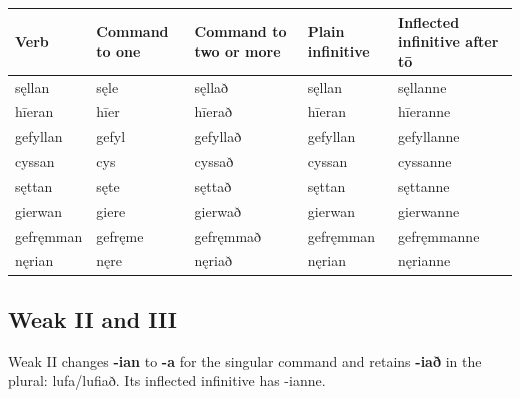 \par\begingroup
\fontsize{10.5}{13.2}\selectfont
\setlength{\LTleft}{0pt}\setlength{\LTright}{\fill}
\noindent
\begin{tabular}{@{}>{\raggedright\arraybackslash}p{18.5mm}>{\raggedright\arraybackslash}p{17.13mm}>{\raggedright\arraybackslash}p{25.07mm}>{\raggedright\arraybackslash}p{21.44mm}>{\raggedright\arraybackslash}p{30.62mm}@{}}
\toprule
\textbf{Verb} & \textbf{Command to one} & \textbf{Command to two or more} & \textbf{Plain infinitive} & \textbf{Inflected infinitive after tō} \\
\midrule
sęllan & sęle & sęllað & sęllan & sęllanne \\
hīeran & hīer & hīerað & hīeran & hīeranne \\
gefyllan & gefyl & gefyllað & gefyllan & gefyllanne \\
cyssan & cys & cyssað & cyssan & cyssanne \\
sęttan & sęte & sęttað & sęttan & sęttanne \\
gierwan & giere & gierwað & gierwan & gierwanne \\
gefręmman & gefręme & gefręmmað & gefręmman & gefręmmanne \\
nęrian & nęre & nęriað & nęrian & nęrianne \\
\bottomrule
\end{tabular}
\par\endgroup

\subsection*{Weak II and III}

Weak II changes \textbf{-ian} to \textbf{-a} for the singular command and retains \textbf{-iað} in the plural: lufa/\allowbreak{}lufiað. Its inflected infinitive has -ianne.

